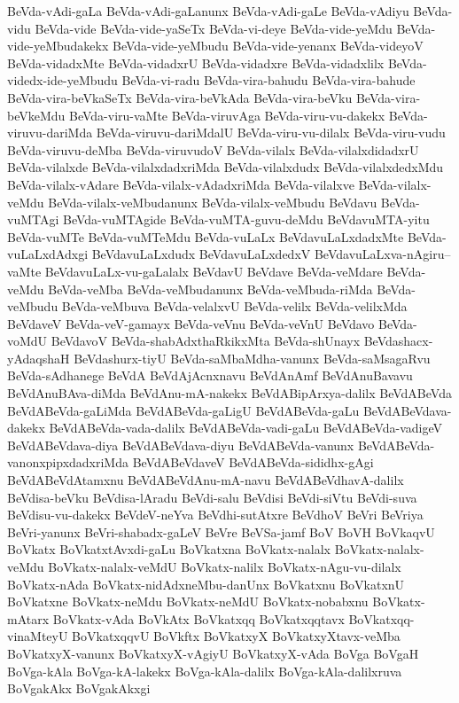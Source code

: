 {BeVda-vAdi-gaLa
BeVda-vAdi-gaLanunx
BeVda-vAdi-gaLe
BeVda-vAdiyu
BeVda-vidu
BeVda-vide
BeVda-vide-yaSeTx
BeVda-vi-deye
BeVda-vide-yeMdu
BeVda-vide-yeMbudakekx
BeVda-vide-yeMbudu
BeVda-vide-yenanx
BeVda-videyoV
BeVda-vidadxMte
BeVda-vidadxrU
BeVda-vidadxre
BeVda-vidadxlilx
BeVda-videdx-ide-yeMbudu
BeVda-vi-radu
BeVda-vira-bahudu
BeVda-vira-bahude
BeVda-vira-beVkaSeTx
BeVda-vira-beVkAda
BeVda-vira-beVku
BeVda-vira-beVkeMdu
BeVda-viru-vaMte
BeVda-viruvAga
BeVda-viru-vu-dakekx
BeVda-viruvu-dariMda
BeVda-viruvu-dariMdalU
BeVda-viru-vu-dilalx
BeVda-viru-vudu
BeVda-viruvu-deMba
BeVda-viruvudoV
BeVda-vilalx
BeVda-vilalxdidadxrU
BeVda-vilalxde
BeVda-vilalxdadxriMda
BeVda-vilalxdudx
BeVda-vilalxdedxMdu
BeVda-vilalx-vAdare
BeVda-vilalx-vAdadxriMda
BeVda-vilalxve
BeVda-vilalx-veMdu
BeVda-vilalx-veMbudanunx
BeVda-vilalx-veMbudu
BeVdavu
BeVda-vuMTAgi
BeVda-vuMTAgide
BeVda-vuMTA-guvu-deMdu
BeVdavuMTA-yitu
BeVda-vuMTe
BeVda-vuMTeMdu
BeVda-vuLaLx
BeVdavuLaLxdadxMte
BeVda-vuLaLxdAdxgi
BeVdavuLaLxdudx
BeVdavuLaLxdedxV
BeVdavuLaLxva-nAgiru--vaMte
BeVdavuLaLx-vu-gaLalalx
BeVdavU
BeVdave
BeVda-veMdare
BeVda-veMdu
BeVda-veMba
BeVda-veMbudanunx
BeVda-veMbuda-riMda
BeVda-veMbudu
BeVda-veMbuva
BeVda-velalxvU
BeVda-velilx
BeVda-velilxMda
BeVdaveV
BeVda-veV-gamayx
BeVda-veVnu
BeVda-veVnU
BeVdavo
BeVda-voMdU
BeVdavoV
BeVda-shabAdxthaRkikxMta
BeVda-shUnayx
BeVdashacx-yAdaqshaH
BeVdashurx-tiyU
BeVda-saMbaMdha-vanunx
BeVda-saMsagaRvu
BeVda-sAdhanege
BeVdA
BeVdAjAcnxnavu
BeVdAnAmf
BeVdAnuBavavu
BeVdAnuBAva-diMda
BeVdAnu-mA-nakekx
BeVdABipArxya-dalilx
BeVdABeVda
BeVdABeVda-gaLiMda
BeVdABeVda-gaLigU
BeVdABeVda-gaLu
BeVdABeVdava-dakekx
BeVdABeVda-vada-dalilx
BeVdABeVda-vadi-gaLu
BeVdABeVda-vadigeV
BeVdABeVdava-diya
BeVdABeVdava-diyu
BeVdABeVda-vanunx
BeVdABeVda-vanonxpipxdadxriMda
BeVdABeVdaveV
BeVdABeVda-sididhx-gAgi
BeVdABeVdAtamxnu
BeVdABeVdAnu-mA-navu
BeVdABeVdhavA-dalilx
BeVdisa-beVku
BeVdisa-lAradu
BeVdi-salu
BeVdisi
BeVdi-siVtu
BeVdi-suva
BeVdisu-vu-dakekx
BeVdeV-neYva
BeVdhi-sutAtxre
BeVdhoV
BeVri
BeVriya
BeVri-yanunx
BeVri-shabadx-gaLeV
BeVre
BeVSa-jamf
BoV
BoVH
BoVkaqvU
BoVkatx
BoVkatxtAvxdi-gaLu
BoVkatxna
BoVkatx-nalalx
BoVkatx-nalalx-veMdu
BoVkatx-nalalx-veMdU
BoVkatx-nalilx
BoVkatx-nAgu-vu-dilalx
BoVkatx-nAda
BoVkatx-nidAdxneMbu-danUnx
BoVkatxnu
BoVkatxnU
BoVkatxne
BoVkatx-neMdu
BoVkatx-neMdU
BoVkatx-nobabxnu
BoVkatx-mAtarx
BoVkatx-vAda
BoVkAtx
BoVkatxqq
BoVkatxqqtavx
BoVkatxqq-vinaMteyU
BoVkatxqqvU
BoVkftx
BoVkatxyX
BoVkatxyXtavx-veMba
BoVkatxyX-vanunx
BoVkatxyX-vAgiyU
BoVkatxyX-vAda
BoVga
BoVgaH
BoVga-kAla
BoVga-kA-lakekx
BoVga-kAla-dalilx
BoVga-kAla-dalilxruva
BoVgakAkx
BoVgakAkxgi
}
